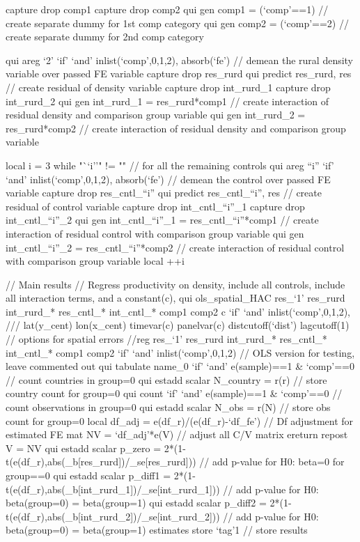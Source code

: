 	capture drop comp1
	capture drop comp2
	qui gen comp1 = (`comp'==1) // create separate dummy for 1st comp category
	qui gen comp2 = (`comp'==2) // create separate dummy for 2nd comp category
	
	qui areg `2' `if' `and' inlist(`comp',0,1,2), absorb(`fe') // demean the rural density variable over passed FE variable
	capture drop res_rurd
	qui predict res_rurd, res // create residual of density variable
	capture drop int_rurd_1
	capture drop int_rurd_2
	qui gen int_rurd_1 = res_rurd*comp1 // create interaction of residual density and comparison group variable
	qui gen int_rurd_2 = res_rurd*comp2 // create interaction of residual density and comparison group variable
		
	local i = 3 
	while "``i''" != "" { // for all the remaining controls
		qui areg ``i'' `if' `and' inlist(`comp',0,1,2), absorb(`fe') // demean the control over passed FE variable
		capture drop res_cntl_``i''
		qui predict res_cntl_``i'', res // create residual of control variable
		capture drop int_cntl_``i''_1
		capture drop int_cntl_``i''_2
		qui gen int_cntl_``i''_1 = res_cntl_``i''*comp1 // create interaction of residual control with comparison group variable
		qui gen int_cntl_``i''_2 = res_cntl_``i''*comp2 // create interaction of residual control with comparison group variable
		local ++i
	}

	// Main results
	// Regress productivity on density, include all controls, include all interaction terms, and a constant(c), 
	qui ols_spatial_HAC res_`1' res_rurd int_rurd_* res_cntl_* int_cntl_* comp1 comp2 c `if' `and' inlist(`comp',0,1,2), ///
			lat(y_cent) lon(x_cent) timevar(c) panelvar(c) distcutoff(`dist') lagcutoff(1)	// options for spatial errors
	//reg res_`1' res_rurd int_rurd_* res_cntl_* int_cntl_* comp1 comp2 `if' `and' inlist(`comp',0,1,2) // OLS version for testing, leave commented out
	qui tabulate name_0 `if' `and' e(sample)==1 & `comp'==0 // count countries in group=0
	qui estadd scalar N_country = r(r) // store country count for group=0
	qui count `if' `and' e(sample)==1 & `comp'==0 // count observations in group=0
	qui estadd scalar N_obs = r(N) // store obs count for group=0
	local df_adj = e(df_r)/(e(df_r)-`df_fe') // Df adjustment for estimated FE
	mat NV = `df_adj'*e(V) // adjust all C/V matrix
	ereturn repost V = NV
	qui estadd scalar p_zero = 2*(1-t(e(df_r),abs(_b[res_rurd])/_se[res_rurd])) // add p-value for H0: beta=0 for group==0		
	qui estadd scalar p_diff1 = 2*(1-t(e(df_r),abs(_b[int_rurd_1])/_se[int_rurd_1])) // add p-value for H0: beta(group=0) = beta(group=1)
	qui estadd scalar p_diff2 = 2*(1-t(e(df_r),abs(_b[int_rurd_2])/_se[int_rurd_2])) // add p-value for H0: beta(group=0) = beta(group=1)
	estimates store `tag'1 // store results
	
